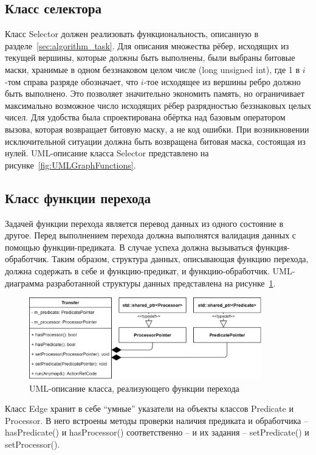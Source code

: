 \subsection{Класс селектора}
Класс \textsf{Selector} должен реализовать функциональность, описанную в разделе~\ref{sec:algorithm_task}. Для описания множества рёбер, исходящих из текущей вершины, которые должны быть выполнены, были выбраны битовые маски, хранимые в одном беззнаковом целом числе (\textsf{long unsigned int}), где 1 в $i$-том справа разряде обозначает, что $i$-тое исходящее из вершины ребро должно быть выполнено. Это позволяет значительно экономить память, но ограничивает максимально возможное число исходящих рёбер разрядностью беззнаковых целых чисел. Для удобства была спроектирована обёртка над базовым оператором вызова, которая возвращает битовую маску, а не код ошибки. При возникновении исключительной ситуации должна быть возвращена битовая маска, состоящая из нулей. UML-описание класса \textsf{Selector} представлено на рисунке~\ref{fig:UMLGraphFunctions}.

\subsection{Класс функции перехода}
Задачей функции перехода является перевод данных из одного состояние в другое. Перед выполнением перехода должна выполнятся валидация данных с помощью функции-предиката. В случае успеха должна вызываться функция-обработчик. Таким образом, структура данных, описывающая функцию перехода, должна содержать в себе и функцию-предикат, и функцию-обработчик. UML-диаграмма разработанной структуры данных представлена на рисунке~\ref{fig:UMLTransfer}.
\begin{figure}[!ht]
    \centering
    \includegraphics[width=0.90\textwidth]{figures/UML.transfer.png}
    \caption{UML-описание класса, реализующего функции перехода}
    \label{fig:UMLTransfer}
\end{figure}

Класс \textsf{Edge} хранит в себе ``умные'' указатели на объекты классов \textsf{Predicate} и \textsf{Processor}. В него встроены методы проверки наличия предиката и обработчика -- \textsf{hasPredicate()} и \textsf{hasProcessor()} соответственно -- и их задания -- \textsf{setPredicate()} и \textsf{setProcessor()}.

